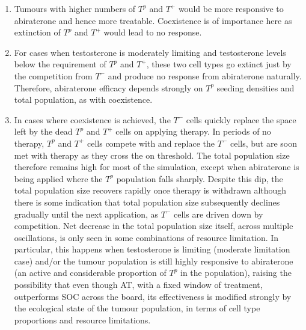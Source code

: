 \begin{enumerate}
  \item Tumours with higher numbers of $T^p$ and $T^+$ would be more responsive to abiraterone and hence more treatable. Coexistence is of importance here as extinction of $T^p$ and $T^+$ would lead to no response.
  \item For cases when testosterone is moderately limiting and testosterone levels below the requirement of $T^p$ and $T^+$, these two cell types go extinct just by the competition from $T^-$ and produce no response from abiraterone naturally. Therefore, abiraterone efficacy depends strongly on $T^p$ seeding densities and total population, as with coexistence.
  \item In cases where coexistence is achieved, the $T^-$ cells quickly replace the space left by the dead $T^p$ and $T^+$ cells on applying therapy. In periods of no therapy, $T^p$ and $T^+$ cells compete with and replace the $T^-$ cells, but are soon met with therapy as they cross the on threshold. The total population size therefore remains high for most of the simulation, except when abiraterone is being applied where the $T^p$ population falls sharply. Despite this dip, the total population size recovers rapidly once therapy is withdrawn although there is some indication that total population size subsequently declines gradually until the next application, as $T^-$ cells are driven down by competition. Net decrease in the total population size itself, across multiple oscillations, is only seen in some combinations of resource limitation. In particular, this happens when testosterone is limiting (moderate limitation case) and/or the tumour population is still highly responsive to abiraterone (an active and considerable proportion of $T^p$ in the population), raising the possibility that even though AT, with a fixed window of treatment, outperforms SOC across the board, its effectiveness is modified strongly by the ecological state of the tumour population, in terms of cell type proportions and resource limitations.
\end{enumerate}

